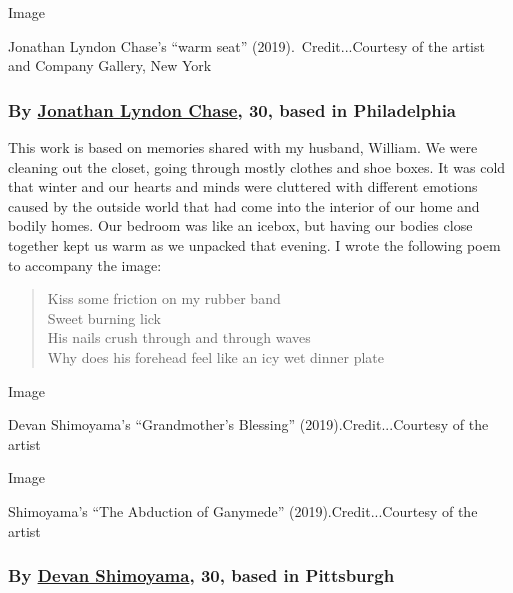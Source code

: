 Image

Jonathan Lyndon Chase's ``warm seat'' (2019).~Credit...Courtesy of the
artist and Company Gallery, New York

\hypertarget{by-jonathan-lyndon-chase-30-based-in-philadelphia}{%
\subsubsection{\texorpdfstring{\textbf{By}
\textbf{\href{https://www.jonathanlyndonchase.com/}{Jonathan Lyndon
Chase}, 30, based in
Philadelphia}}{By Jonathan Lyndon Chase, 30, based in Philadelphia}}\label{by-jonathan-lyndon-chase-30-based-in-philadelphia}}

This work is based on memories shared with my husband, William. We were
cleaning out the closet, going through mostly clothes and shoe boxes. It
was cold that winter and our hearts and minds were cluttered with
different emotions caused by the outside world that had come into the
interior of our home and bodily homes. Our bedroom was like an icebox,
but having our bodies close together kept us warm as we unpacked that
evening. I wrote the following poem to accompany the image:

\begin{quote}
Kiss some friction on my rubber band\\
Sweet burning lick\\
His nails crush through and through waves\\
Why does his forehead feel like an icy wet dinner plate
\end{quote}

Image

Devan Shimoyama's ``Grandmother's Blessing'' (2019).Credit...Courtesy of
the artist

Image

Shimoyama's ``The Abduction of Ganymede'' (2019).Credit...Courtesy of
the artist

\hypertarget{by-devan-shimoyama-30-based-in-pittsburgh}{%
\subsubsection{\texorpdfstring{\textbf{By}
\textbf{\href{https://www.devanshimoyama.com/}{Devan Shimoyama}, 30,
based in
Pittsburgh}}{By Devan Shimoyama, 30, based in Pittsburgh}}\label{by-devan-shimoyama-30-based-in-pittsburgh}}

